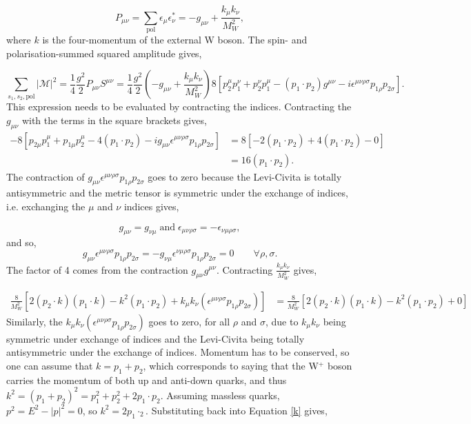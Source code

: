 \documentclass[a4paper,11pt]{article}
\begin{document}
\begin{equation}
	P_{\mu\nu}= \sum_\text{pol} \epsilon_\mu \epsilon_\nu^*=  -g_{\mu\nu} + \frac{k_\mu k_\nu}{M_W^2},
\end{equation}
where $k$ is the four-momentum of the external W boson. The spin- and  polarisation-summed squared amplitude gives,

\begin{equation}\label{spin_pol_square_amp}
	\sum_{s_1, s_2, \text{pol}} |\mathcal{M}|^2=  \frac{1}{4} \frac{g^2}{2} P_{\mu\nu}S^{\mu\nu}= \frac{1}{4} \frac{g^2}{2} \left(-g_{\mu\nu} + \frac{k_\mu k_\nu}{M_W^2}\right)8[p_2^\mu p_1^\nu + p_2^\nu p_1^\mu - (p_1 \cdot p_2) g^{\mu \nu} - i \epsilon^{\mu \nu \rho \sigma}p_{1\rho}p_{2\sigma}].
\end{equation}
This expression needs to be evaluated by contracting the indices. Contracting the $g_{\mu\nu}$ with the terms in the square brackets gives,
\begin{equation}
	\begin{aligned}
		-8[p_{2\mu}p_1^\mu + p_{1\mu}p_2^\mu -4(p_1 \cdot p_2) -ig_{\mu\nu}\epsilon^{\mu \nu \rho \sigma}p_{1\rho}p_{2\sigma}] &= 8[-2(p_1 \cdot p_2) + 4(p_1 \cdot p_2)- 0] \\
		&= 16(p_1 \cdot p_2).
	\end{aligned}
\end{equation}
 The contraction of $g_{\mu\nu}\epsilon^{\mu \nu \rho \sigma}p_{1\rho}p_{2\sigma}$ goes to zero because the Levi-Civita is totally antisymmetric and the metric tensor is symmetric under the exchange of indices, i.e. exchanging the $\mu$ and $\nu$ indices gives,
 
 $$g_{\mu\nu} = g_{\nu\mu} \; \text{and}\; \epsilon_{\mu \nu \rho \sigma} = - \epsilon_{\nu \mu \rho \sigma},$$ 
 and so, 
 $$ g_{\mu\nu}\epsilon^{\mu \nu \rho \sigma}p_{1\rho}p_{2\sigma} = - g_{\nu\mu}\epsilon^{\nu \mu \rho \sigma}p_{1\rho}p_{2\sigma}= 0 \qquad \forall \rho,\sigma. $$
  The factor of 4 comes from the contraction $g_{\mu\nu}g^{\mu\nu}$. Contracting $\frac{k_\mu k_\nu}{M_W^2}$ gives,
 
 \begin{equation}\label{k}
 	\begin{aligned}
		\frac{8}{M_W^2}[2(p_2 \cdot k)(p_1 \cdot k ) - k^2 (p_1 \cdot p_2)+ k_\mu k_\nu (\epsilon^{\mu \nu \rho \sigma}p_{1\rho}p_{2\sigma})] &=  \frac{8}{M_W^2}[2(p_2 \cdot k)(p_1 \cdot k ) - k^2 (p_1 \cdot p_2)+ 0] 
 	\end{aligned}
 \end{equation}
Similarly, the $k_\mu k_\nu (\epsilon^{\mu \nu \rho \sigma}p_{1\rho}p_{2\sigma})$ goes to zero, for all $\rho$ and $\sigma$, due to $k_\mu k_\nu$ being symmetric under exchange of indices and the Levi-Civita being totally antisymmetric under the exchange of indices. Momentum has to be conserved, so one can assume that $k = p_1 + p_2$, which corresponds to saying that the W$^+$ boson carries the momentum of both up and anti-down quarks, and thus $k^2 = ( p_1 + p_2)^2 = p_1^2 + p_2^2 +2p_1\cdot p_2$. Assuming massless quarks, $p^2 = E^2 - |p|^2 = 0 $, so $k^2 = 2p_1\cdotp_2$. Substituting back into Equation  \ref{k} gives,
\end{document}
